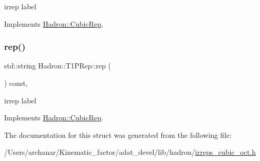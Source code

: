 irrep label 

Implements \mbox{\hyperlink{structHadron_1_1CubicRep_ac3eb63608803d44c68681f158e14eb1b}{Hadron\+::\+Cubic\+Rep}}.

\mbox{\label{structHadron_1_1T1PRep_abf59dcb0de05bb6acf26b43d0dd5e281}} 
\subsubsection{\texorpdfstring{rep()}{rep()}\hspace{0.1cm}{\footnotesize\ttfamily [2/2]}}
{\footnotesize\ttfamily std\+::string Hadron\+::\+T1\+P\+Rep\+::rep (\begin{DoxyParamCaption}{ }\end{DoxyParamCaption}) const\hspace{0.3cm}{\ttfamily [inline]}, {\ttfamily [virtual]}}

irrep label 

Implements \mbox{\hyperlink{structHadron_1_1CubicRep_ac3eb63608803d44c68681f158e14eb1b}{Hadron\+::\+Cubic\+Rep}}.



The documentation for this struct was generated from the following file\+:\begin{DoxyCompactItemize}
\item 
/\+Users/archanar/\+Kinematic\+\_\+factor/adat\+\_\+devel/lib/hadron/\mbox{\hyperlink{lib_2hadron_2irreps__cubic__oct_8h}{irreps\+\_\+cubic\+\_\+oct.\+h}}\end{DoxyCompactItemize}
